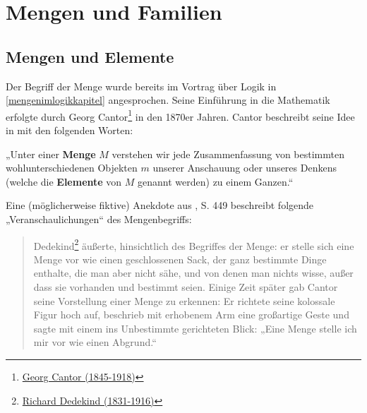 


    
\chapter{Mengen und Familien}


\section{Mengen und Elemente}


Der Begriff der Menge wurde bereits im Vortrag über Logik in \cref{mengenimlogikkapitel} angesprochen. Seine Einführung in die Mathematik erfolgte durch Georg Cantor\footnote{\href{https://de.wikipedia.org/wiki/Georg_Cantor}{Georg Cantor (1845-1918)}} in den 1870er Jahren. Cantor beschreibt seine Idee in \cite{Can95} mit den folgenden Worten:


\begin{de} \label{def:menge} 
    „Unter einer \textbf{Menge} $M$ verstehen wir jede Zusammenfassung von bestimmten wohlunterschiedenen Objekten $m$ unserer Anschauung oder unseres Denkens (welche die \textbf{Elemente} von $M$ genannt werden) zu einem Ganzen.“
\end{de}


\begin{bem}
    Eine (möglicherweise fiktive) Anekdote aus \cite{Ded32}, S. 449 beschreibt folgende „Veranschaulichungen“ des Mengenbegriffs:
    \begin{quote}
        Dedekind\footnote{\href{https://de.wikipedia.org/wiki/Richard_Dedekind}{Richard Dedekind (1831-1916)}} äußerte, hinsichtlich des Begriffes der Menge: er stelle sich eine Menge vor wie einen geschlossenen Sack, der ganz bestimmte Dinge enthalte, die man aber nicht sähe, und von denen man nichts wisse, außer dass sie vorhanden und bestimmt seien. Einige Zeit später gab Cantor seine Vorstellung einer Menge zu erkennen: Er richtete seine kolossale Figur hoch auf, beschrieb mit erhobenem Arm eine großartige Geste und sagte mit einem ins Unbestimmte gerichteten Blick: „Eine Menge stelle ich mir vor wie einen Abgrund.“
    \end{quote}
\end{bem}


